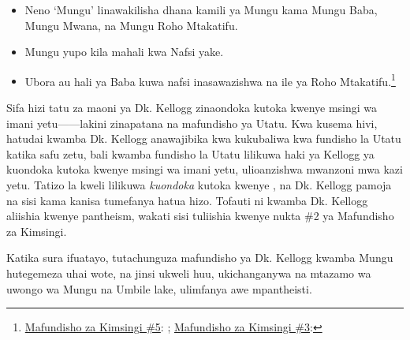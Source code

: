 \begin{itemize}
    \item Neno ‘Mungu’ linawakilisha dhana kamili ya Mungu kama Mungu Baba, Mungu Mwana, na Mungu Roho Mtakatifu.
    \item Mungu yupo kila mahali kwa Nafsi yake.
    \item Ubora au hali ya Baba kuwa nafsi inasawazishwa na ile ya Roho Mtakatifu.\footnote{\href{https://www.adventist.org/wp-content/uploads/2020/06/ADV-28Beliefs2020.pdf}{Mafundisho za Kimsingi \#5}: ; \href{https://www.adventist.org/wp-content/uploads/2020/06/ADV-28Beliefs2020.pdf}{Mafundisho za Kimsingi \#3}: }
\end{itemize}


Sifa hizi tatu za maoni ya Dk. Kellogg zinaondoka kutoka kwenye msingi wa imani yetu——lakini zinapatana na mafundisho ya Utatu. Kwa kusema hivi, hatudai kwamba Dk. Kellogg anawajibika kwa kukubaliwa kwa fundisho la Utatu katika safu zetu, bali kwamba fundisho la Utatu lilikuwa haki ya Kellogg ya kuondoka kutoka kwenye msingi wa imani yetu, ulioanzishwa mwanzoni mwa kazi yetu. Tatizo la kweli lilikuwa \textit{kuondoka} kutoka kwenye , na Dk. Kellogg pamoja na sisi kama kanisa tumefanya hatua hizo. Tofauti ni kwamba Dk. Kellogg aliishia kwenye pantheism, wakati sisi tuliishia kwenye nukta \#2 ya Mafundisho za Kimsingi.


Katika sura ifuatayo, tutachunguza mafundisho ya Dk. Kellogg kwamba Mungu hutegemeza uhai wote, na jinsi ukweli huu, ukichanganywa na mtazamo wa uwongo wa Mungu na Umbile lake, ulimfanya awe mpantheisti.




